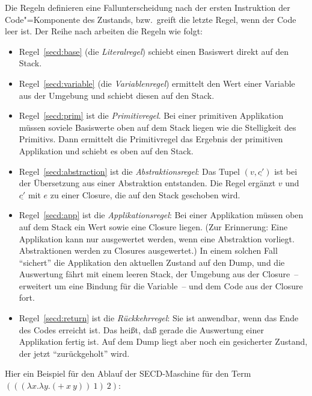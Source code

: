 %
Die Regeln definieren eine Fallunterscheidung nach der ersten
Instruktion der Code"=Komponente des Zustands, bzw.\ greift die letzte
Regel, wenn der Code leer ist.  Der Reihe nach arbeiten die Regeln wie
folgt:
%
\begin{itemize}
\item Regel~\ref{secd:base} (die
  \textit{Literalregel}) schiebt einen Basiswert
  direkt auf den Stack.
\item Regel~\ref{secd:variable} (die
  \textit{Variablenregel}) ermittelt den Wert
  einer Variable aus der Umgebung und schiebt diesen auf den Stack.
\item Regel~\ref{secd:prim} ist die
  \textit{Primitivregel}.  Bei einer primitiven
  Applikation müssen soviele Basiswerte oben auf dem Stack liegen wie
  die Stelligkeit des Primitivs.  Dann ermittelt die Primitivregel das Ergebnis der
  primitiven Applikation und schiebt es oben auf den Stack.
\item Regel~\ref{secd:abstraction} ist die
  \textit{Abstraktionsregel}: Das Tupel
  $(v,\underline{c'})$ ist bei der Übersetzung aus einer Abstraktion
  entstanden.  Die Regel ergänzt $v$ und $\underline{c'}$ mit
  $e$ zu einer Closure, die auf den Stack geschoben wird.
\item Regel~\ref{secd:app} ist die
  \textit{Applikationsregel}: Bei einer
  Applikation müssen oben auf dem Stack ein Wert sowie eine Closure
  liegen.  (Zur Erinnerung: Eine Applikation kann nur ausgewertet
  werden, wenn eine Abstraktion vorliegt.  Abstraktionen werden zu
  Closures ausgewertet.)  In einem solchen Fall "`sichert"' die
  Applikation den aktuellen Zustand auf den Dump, und die Auswertung fährt mit
  einem leeren Stack, der Umgebung aus der Closure~-- erweitert um
  eine Bindung für die Variable~-- und dem Code aus der Closure fort.
\item Regel~\ref{secd:return} ist die
  \textit{Rückkehrregel}: Sie ist anwendbar,
  wenn das Ende des Codes erreicht ist.  Das heißt, daß gerade
  die Auswertung einer Applikation fertig ist.  Auf dem Dump liegt
  aber noch ein gesicherter Zustand, der jetzt "`zurückgeholt"' wird.
\end{itemize}
%
Hier ein Beispiel für den Ablauf der SECD-Maschine für den Term
$(((\lambda x.\lambda y.(+~x~y))~1)~2)$:
%
